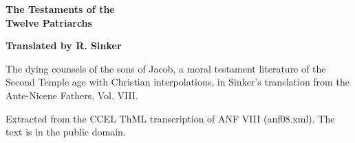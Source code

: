 \documentclass[11pt,letterpaper]{article}
\begin{document}
\color{ink}

\begin{titlepage}
\centering
\vspace*{4em}
{\LARGE\bfseries\color{heading} The Testaments of the\\[0.3em]Twelve Patriarchs\par}
\vspace{2em}
{\Large\bfseries\color{heading} Translated by R. Sinker\par}
\vspace{2.5em}
{\itshape\color{subhead}\parbox{0.8\linewidth}{\centering The dying counsels of the sons of Jacob, a moral testament literature of the Second Temple age with Christian interpolations, in Sinker's translation from the Ante-Nicene Fathers, Vol. VIII.\par}}
\vfill
{\small Extracted from the CCEL ThML transcription of ANF VIII (anf08.xml). The text is in the public domain.\par}
\vspace{2em}
\end{titlepage}

\tableofcontents


\end{document}
